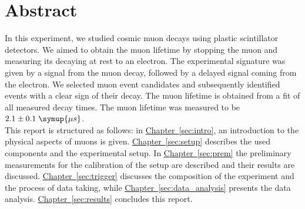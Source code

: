 \thispagestyle{plain}
\section*{Abstract}
In this experiment, we studied cosmic muon decays using plastic scintillator detectors.
We aimed to obtain the muon lifetime by stopping the muon and measuring its decaying at 
rest to an electron. The experimental signature was given by a signal from the muon decay,
followed by a delayed signal coming from the electron. We selected muon event candidates 
and subsequently identified events with a clear sign of their decay. The muon lifetime
is obtained from a fit of all measured decay times.
The muon lifetime was measured to be $2.1 \pm 0.1 \; \symup{\mu s}$.\\


This report is structured as follows: in \hyperref[sec:intro]{Chapter~\ref*{sec:intro}}, an introduction to the physical aspects of muons is given.
\hyperref[sec:setup]{Chapter~\ref*{sec:setup}} describes the used components and the experimental setup. In \hyperref[sec:prem]{Chapter~\ref*{sec:prem}}
the preliminary measurements for the calibration of the setup are described and their results are discussed. \hyperref[sec:trigger]{Chapter~\ref*{sec:trigger}} discusses the composition of the experiment and the process of data taking, while \hyperref[sec:data_analysis]{Chapter~\ref*{sec:data_analysis}} presents the data analysis. \hyperref[sec:results]{Chapter~\ref*{sec:results}} concludes this report.
